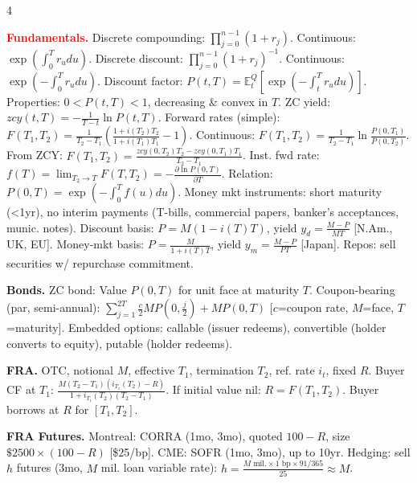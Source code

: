 \documentclass[landscape]{article}
\begin{document}
\begin{multicols}{4}
\setlength{\multicolsep}{0pt}



\textcolor{red}{\textbf{Fundamentals.}}
Discrete compounding: $\prod_{j=0}^{n-1}(1+r_j)$. Continuous: $\exp(\int_0^T r_u du)$. Discrete discount: $\prod_{j=0}^{n-1}(1+r_j)^{-1}$. Continuous: $\exp(-\int_0^T r_u du)$.
Discount factor: $P(t,T)=\mathbb{E}_t^Q[\exp(-\int_t^T r_u du)]$. Properties: $0<P(t,T)<1$, decreasing \& convex in $T$.
ZC yield: $zcy(t,T)=-\frac{1}{T-t}\ln P(t,T)$.
Forward rates (simple): $F(T_1,T_2)=\frac{1}{T_2-T_1}(\frac{1+i(T_2)T_2}{1+i(T_1)T_1}-1)$. Continuous: $F(T_1,T_2)=\frac{1}{T_2-T_1}\ln\frac{P(0,T_1)}{P(0,T_2)}$. From ZCY: $F(T_1,T_2)=\frac{zcy(0,T_2)T_2-zcy(0,T_1)T_1}{T_2-T_1}$.
Inst. fwd rate: $f(T)=\lim_{T_2\to T}F(T,T_2)=-\frac{\partial\ln P(0,T)}{\partial T}$. Relation: $P(0,T)=\exp(-\int_0^T f(u)du)$.
Money mkt instruments: short maturity (<1yr), no interim payments (T-bills, commercial papers, banker's acceptances, munic. notes). Discount basis: $P=M(1-i(T)T)$, yield $y_d=\frac{M-P}{MT}$ [N.Am., UK, EU]. Money-mkt basis: $P=\frac{M}{1+i(T)T}$, yield $y_m=\frac{M-P}{PT}$ [Japan]. Repos: sell securities w/ repurchase commitment.

\textbf{Bonds.} ZC bond: Value $P(0,T)$ for unit face at maturity $T$. Coupon-bearing (par, semi-annual): $\sum_{j=1}^{2T}\frac{c}{2}MP(0,\frac{j}{2})+MP(0,T)$ [$c$=coupon rate, $M$=face, $T$=maturity]. Embedded options: callable (issuer redeems), convertible (holder converts to equity), putable (holder redeems).

\textbf{FRA.} OTC, notional $M$, effective $T_1$, termination $T_2$, ref. rate $i_t$, fixed $R$. Buyer CF at $T_1$: $\frac{M(T_2-T_1)(i_{T_1}(T_2)-R)}{1+i_{T_1}(T_2)(T_2-T_1)}$. If initial value nil: $R=F(T_1,T_2)$. Buyer borrows at $R$ for $[T_1,T_2]$.

\textbf{FRA Futures.} Montreal: CORRA (1mo, 3mo), quoted $100-R$, size $\$2500\times(100-R)$ [\$25/bp]. CME: SOFR (1mo, 3mo), up to 10yr. Hedging: sell $h$ futures (3mo, $M$ mil. loan variable rate): $h=\frac{M\text{ mil.}\times 1\text{ bp}\times 91/365}{25}\approx M$.


\end{multicols}
\end{document}
